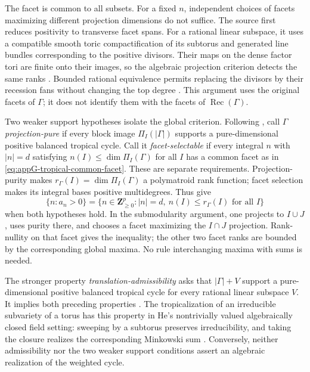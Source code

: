 The facet is common to all subsets. For a fixed $n$, independent
choices of facets maximizing different projection dimensions
do not suffice. The source first reduces positivity to
transverse facet spans. For a rational linear subspace, it
uses a compatible smooth toric compactification of its subtorus
and generated line bundles corresponding to the positive
divisors. Their maps on the dense factor tori are finite onto
their images, so the algebraic projection criterion detects
the same ranks
\cite[Lemmas~3.1 and~3.3, Proposition~3.4]{CidRuiz26TropicalMultidegreesV2}.
Bounded rational equivalence permits replacing
the divisors by their recession fans without changing the
top degree \cite[Proposition~3.2(a),(d),(e), Proposition~3.3
and Theorem~5.3]{AllermannHampeRau15RationalEquivalenceV2}.
This argument uses the original facets of $\Gamma$; it does
not identify them with the facets of $\operatorname{Rec}(\Gamma)$.

Two weaker support hypotheses isolate the global criterion.
Following \cite[Definition~2.6]{CidRuiz26TropicalMultidegreesV2},
call $\Gamma$ \emph{projection-pure} if every block image
$\Pi_I(|\Gamma|)$ supports a pure-dimensional positive balanced
tropical cycle. Call it \emph{facet-selectable} if every integral
$n$ with $|n|=d$ satisfying
$n(I)\leq\dim\Pi_I(\Gamma)$ for all $I$ has a common facet
as in \eqref{eq:appG-tropical-common-facet}. These are separate
requirements. Projection-purity makes
$r_\Gamma(I)=\dim\Pi_I(\Gamma)$ a polymatroid rank function;
facet selection makes its integral bases positive multidegrees.
Thus \cite[Proposition~2.12 and Theorem~3.7]{CidRuiz26TropicalMultidegreesV2}
give
\[
 \{n:a_n>0\}
  =\{n\in\mathbf Z_{\geq0}^p:|n|=d,\ n(I)\leq r_\Gamma(I)
                                            \text{ for all }I\}
\tag{G.35}\label{eq:appG-tropical-polymatroid-support}
\]
when both hypotheses hold. In the submodularity argument,
one projects to $I\cup J$, uses purity there, and chooses
a facet maximizing the $I\cap J$ projection. Rank-nullity
on that facet gives the inequality; the other two facet
ranks are bounded by the corresponding global maxima.
No rule interchanging maxima with sums is needed.

The stronger property \emph{translation-admissibility} asks that
$|\Gamma|+V$ support a pure-dimensional positive balanced
tropical cycle for every rational linear subspace $V$.
It implies both preceding properties
\cite[Lemmas~2.11 and~3.1]{He24TropicalMultidegreesV2}.
The tropicalization of an irreducible subvariety of a torus
has this property in He's nontrivially valued algebraically
closed field setting: sweeping by a subtorus preserves
irreducibility, and taking the closure realizes the corresponding
Minkowski sum \cite[Lemma~2.13]{He24TropicalMultidegreesV2}.
Conversely, neither admissibility nor the two weaker support
conditions assert an algebraic realization of the weighted cycle.

